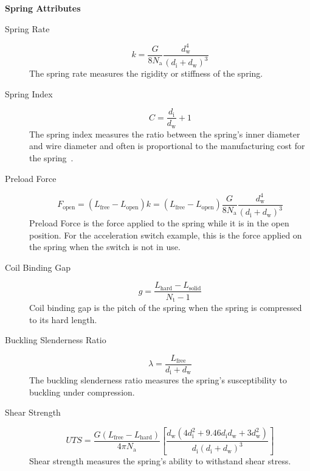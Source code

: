 \documentclass[10pt]{article}
\begin{document}
		\begin{center}\textbf{Spring Attributes}\end{center}
			\begin{description}
				\item [Spring Rate] \begin{equation} k = \frac{G}{8N_{\text{a}}}\frac{d_{\text{w}}^{4}}{(d_{\text{i}} + d_{\text{w}})^{3}}\end{equation}
				The spring rate measures the rigidity or stiffness of the spring. 
			
			\item[Spring Index]\begin{equation}C = \frac{d_{\text{i}}}{d_{\text{w}}} + 1\end{equation}
				The spring index measures the ratio between the spring's inner diameter and wire diameter and often is proportional to the manufacturing cost for the spring~\cite{SpringIndex}.
			
			\item[Preload Force]\begin{equation*} F_{\text{open}} = (L_{\text{free}}-L_{\text{open}})k = (L_{\text{free}}-L_{\text{open}})\frac{G}{8N_{\text{a}}}\frac{d_{\text{w}}^{4}}{(d_{\text{i}} + d_{\text{w}})^{3}} \end{equation*}
				Preload Force is the force applied to the spring while it is in the open position. For the acceleration switch example, this is the force applied on the spring when the switch is not in use.  
				
			\item[Coil Binding Gap]\begin{equation} g = \frac{L_{\text{hard}} - L_{\text{solid}}}{N_{\text{t}} - 1}\end{equation}		
				Coil binding gap is the pitch of the spring when the spring is compressed to its hard length. 
			 
			 \item[Buckling Slenderness Ratio]\begin{equation*} \lambda = \frac{L_{\text{free}}}{d_{\text{i}} + d_{\text{w}}} \end{equation*}
			 	The buckling slenderness ratio measures the spring's susceptibility to buckling under compression.
			 
			 \item[Shear Strength]\begin{equation} UTS = \frac{G(L_{\text{free}} - L_{\text{hard}})}{4 \pi N_{\text{a}}} \left[\frac{d_{\text{w}} (4d_{\text{i}}^{2} + 9.46d_{\text{i}} 
d_{\text{w}} + 3 d_{\text{w}}^{2})}{d_{\text{i}}(d_{\text{i}}+d_{\text{w}})^{3}}\right]\end{equation}
				Shear strength measures the spring's ability to withstand shear stress. 
			

\end{description}
\end{document}
